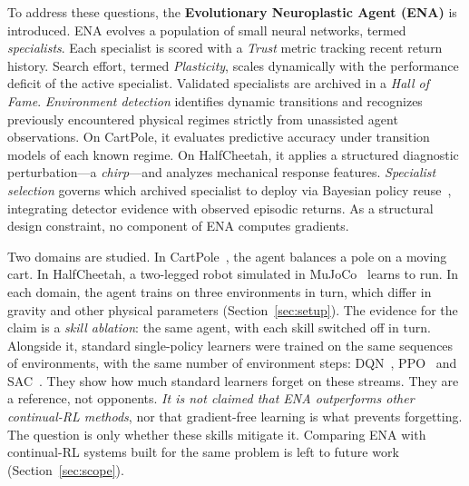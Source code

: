 To address these questions, the \textbf{Evolutionary Neuroplastic Agent (ENA)} is introduced. ENA evolves a population of small neural networks, termed \textit{specialists}. Each specialist is scored with a \textit{Trust} metric tracking recent return history. Search effort, termed \textit{Plasticity}, scales dynamically with the performance deficit of the active specialist. Validated specialists are archived in a \textit{Hall of Fame}. \textit{Environment detection} identifies dynamic transitions and recognizes previously encountered physical regimes strictly from unassisted agent observations. On CartPole, it evaluates predictive accuracy under transition models of each known regime. On HalfCheetah, it applies a structured diagnostic perturbation—a \textit{chirp}—and analyzes mechanical response features. \textit{Specialist selection} governs which archived specialist to deploy via Bayesian policy reuse~\cite{rosman2016bayesian}, integrating detector evidence with observed episodic returns. As a structural design constraint, no component of ENA computes gradients.

Two domains are studied. In CartPole~\cite{barto1983neuronlike}, the agent balances a pole on a moving cart. In HalfCheetah, a two-legged robot simulated in MuJoCo~\cite{todorov2012mujoco} learns to run. In each domain, the agent trains on three environments in turn, which differ in gravity and other physical parameters (Section~\ref{sec:setup}). The evidence for the claim is a \textit{skill ablation}: the same agent, with each skill switched off in turn. Alongside it, standard single-policy learners were trained on the same sequences of environments, with the same number of environment steps: DQN~\cite{mnih2015human}, PPO~\cite{schulman2017proximal} and SAC~\cite{haarnoja2018soft}. They show how much standard learners forget on these streams. They are a reference, not opponents. \textit{It is not claimed that ENA outperforms other continual-RL methods}, nor that gradient-free learning is what prevents forgetting. The question is only whether these skills mitigate it. Comparing ENA with continual-RL systems built for the same problem is left to future work (Section~\ref{sec:scope}).

